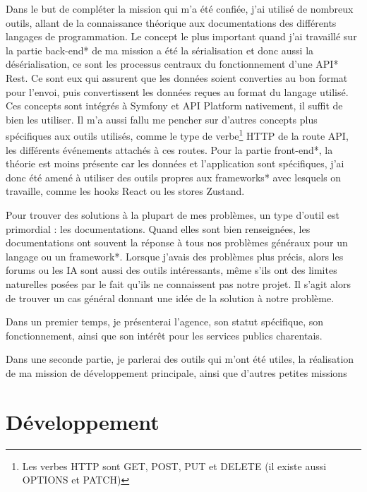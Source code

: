 \documentclass[a4paper,12pt]{report}
\begin{document}
\vspace{1em}

Dans le but de compléter la mission qui m'a été confiée, j'ai utilisé de nombreux outils, allant de la connaissance théorique aux documentations des différents langages de programmation. Le concept le plus important quand j'ai travaillé sur la partie back-end* de ma mission a été la sérialisation et donc aussi la désérialisation, ce sont les processus centraux du fonctionnement d'une API* Rest. Ce sont eux qui assurent que les données soient converties au bon format pour l'envoi, puis convertissent les données reçues au format du langage utilisé. Ces concepts sont intégrés à Symfony et API Platform nativement, il suffit de bien les utiliser. Il m'a aussi fallu me pencher sur d'autres concepts plus spécifiques aux outils utilisés, comme le type de verbe\footnote{Les verbes HTTP sont GET, POST, PUT et DELETE (il existe aussi OPTIONS et PATCH)} HTTP de la route API, les différents événements attachés à ces routes. Pour la partie front-end*, la théorie est moins présente car les données et l'application sont spécifiques, j'ai donc été amené à utiliser des outils propres aux frameworks* avec lesquels on travaille, comme les hooks React ou les stores Zustand.

\vspace{1em}

Pour trouver des solutions à la plupart de mes problèmes, un type d'outil est primordial : les documentations. Quand elles sont bien renseignées, les documentations ont souvent la réponse à tous nos problèmes généraux pour un langage ou un framework*. Lorsque j'avais des problèmes plus précis, alors les forums ou les IA sont aussi des outils intéressants, même s'ils ont des limites naturelles posées par le fait qu'ils ne connaissent pas notre projet. Il s'agit alors de trouver un cas général donnant une idée de la solution à notre problème.

\vspace{1em}

Dans un premier temps, je présenterai l'agence, son statut spécifique, son fonctionnement, ainsi que son intérêt pour les services publics charentais.


Dans une seconde partie, je parlerai des outils qui m'ont été utiles, la réalisation de ma mission de développement principale, ainsi que d'autres petites missions

\chapter{Développement}
\end{document}
